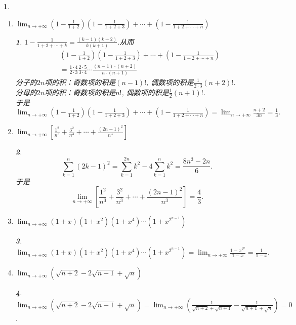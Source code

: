 \documentclass[utf8]{book}
\newtheorem{example}{}[section]             %
\newtheorem{solution}{}
\begin{document}
\begin{example}
\begin{enumerate}
\item $\displaystyle \lim_{n\to +\infty}\left(1-\frac{1}{1+2}\right)\left(1-\frac{1}{1+2+3}\right)+\cdots+\left(1-\frac{1}{1+2+\cdots+n}\right)$
\begin{solution}
$\displaystyle 1-\frac{1}{1+2+\cdots+k} = \frac{(k-1)(k+2)}{k(k+1)}$.从而
\begin{equation*}
\begin{split}
&\left(1-\frac{1}{1+2}\right)\left(1-\frac{1}{1+2+3}\right)+\cdots+\left(1-\frac{1}{1+2+\cdots+n}\right) \\
&=\frac{1\cdot 4}{2\cdot 3}\frac{2 \cdot 5}{3\cdot 4}\cdots \frac{(n-1)\cdot (n+2)}{n\cdot (n+1)}
\end{split}
\end{equation*}
分子的$2n$项的积：奇数项的积是$(n-1)!$, 偶数项的积是$\frac{1}{2\cdot 3}(n+2)!$.\\
分母的$2n$项的积：奇数项的积是$n!$, 偶数项的积是$\frac{1}{2}(n+1)!$.\\
于是$\displaystyle \lim_{n\to +\infty}\left(1-\frac{1}{1+2}\right)\left(1-\frac{1}{1+2+3}\right)+\cdots+\left(1-\frac{1}{1+2+\cdots+n}\right) = 
\lim_{n\to +\infty}\frac{n+2}{3n} = \frac{1}{3}.$
\end{solution}

\item $\displaystyle \lim_{n\to +\infty}\left[\frac{1^2}{n^3}+\frac{3^2}{n^3}+\cdots+\frac{(2n-1)^2}{n^3}\right]$
\begin{solution}
$$\sum_{k=1}^{n}(2k-1)^2 =\sum_{k=1}^{2n}k^2 - 4\sum_{k=1}^{n}k^2= \frac{8n^3 - 2n}{6}.$$
于是$$\displaystyle \lim_{n\to +\infty}\left[\frac{1^2}{n^3}+\frac{3^2}{n^3}+\cdots+\frac{(2n-1)^2}{n^3}\right] = \frac{4}{3}.$$
\end{solution}

\item $\displaystyle \lim_{n\to +\infty}(1+x)(1+x^2)(1+x^4)\cdots(1+x^{2^{n - 1}})$
\begin{solution}
$\displaystyle \lim_{n\to +\infty}(1+x)(1+x^2)(1+x^4)\cdots(1+x^{2^{n - 1}}) = \displaystyle \lim_{n\to +\infty}\frac{1-x^{2^n}}{1-x}=\frac{1}{1-x}.$
\end{solution}

\item $\displaystyle \lim_{n\to +\infty}(\sqrt{n+2}-2\sqrt{n+1}+\sqrt{n})$
\begin{solution}
$\displaystyle \lim_{n\to +\infty}(\sqrt{n+2}-2\sqrt{n+1}+\sqrt{n})=
\lim_{n\to +\infty}\left(\frac{1}{\sqrt{n+2}+\sqrt{n+1}}-\frac{1}{\sqrt{n+1}+\sqrt{n}}\right)=0$.
\end{solution}
\end{enumerate}
\end{example}
\end{document}
